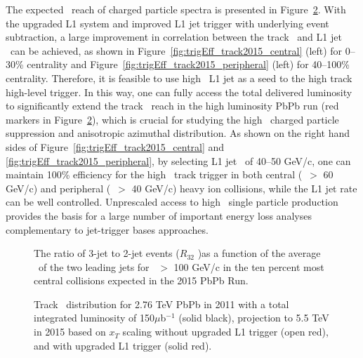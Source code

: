 The expected \pt\ reach of charged particle spectra is presented in
Figure~\ref{fig:xT_scaling}.
With the upgraded L1 system and improved L1 jet trigger with underlying
event subtraction,
a large improvement in correlation between the track \pt\ and L1 jet \pt\ can be
achieved, as shown in
Figure~\ref{fig:trigEff_track2015_central} (left) for 0--30\% centrality and
Figure~\ref{fig:trigEff_track2015_peripheral} (left) for 40--100\%
centrality.
Therefore, it is feasible to use high \pt\ L1 jet as a seed to the high \pt
track high-level trigger.
In this way, one can fully access the total delivered luminosity to
significantly extend the track \pt\ reach in the high luminosity PbPb run 
(red markers in Figure~\ref{fig:xT_scaling}),
which is crucial for studying the high \pt\ charged particle suppression and
anisotropic azimuthal distribution.
As shown on the right hand sides of
Figure~\ref{fig:trigEff_track2015_central} and
\ref{fig:trigEff_track2015_peripheral},
by selecting L1 jet \pt\ of 40--50 GeV/c, one can maintain 100\%
efficiency for the high \pt\ track trigger
in both central (\pt\ $>$ 60 GeV/c) and peripheral (\pt\ $>$ 40 GeV/c) heavy ion collisions, 
while the L1 jet rate can be well controlled. Unprescaled access to high \pt\ 
single particle production provides the basis for a large number of 
important energy loss analyses complementary to jet-trigger bases approaches.


\begin{figure}[!ht]
\begin{center}
\caption{The ratio of 3-jet to 2-jet events ($R_{32}$ )as a function of the
average \pt\ of the two leading jets for \pt\ $> $ 100 GeV/c 
in the ten percent most central collisions expected in the 2015 PbPb Run.}
\label{fig:r32_2015}
\end{center}
\end{figure}

\begin{figure}[!ht]
\begin{center}
\caption{Track \pt\ distribution for 2.76 TeV PbPb in 2011 with a total
integrated luminosity
         of 150$\mu$b$^{-1}$ (solid black), projection to 5.5 TeV in 2015
based on $x_T$ scaling 
         without upgraded L1 trigger (open red), and with upgraded L1
trigger (solid red).}
\label{fig:xT_scaling}
\end{center}
\end{figure}

